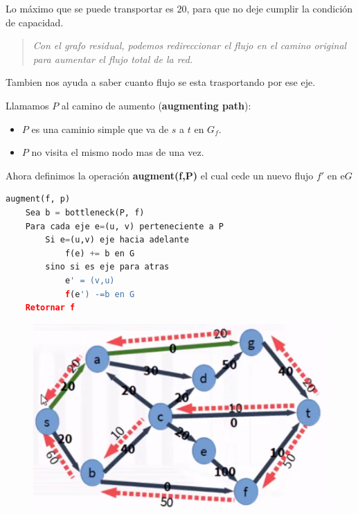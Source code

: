 \documentclass{article}
\begin{document}
Lo máximo que se puede transportar es 20, para que no deje cumplir la condición de capacidad.

\begin{quote}
    \textit{Con el grafo residual, podemos redireccionar el flujo en el camino original para aumentar el flujo total de la red.}
\end{quote}

Tambien nos ayuda a saber cuanto flujo se esta trasportando por ese eje.

Llamamos \(P\) al camino de aumento (\textbf{augmenting path}):

\begin{itemize}
    \item \(P\) es una caminio simple que va de \(s\) a \(t\) en \(G_f\).
    \item \(P\) no visita el mismo nodo mas de una vez.
\end{itemize}
 
Ahora definimos la operación \textbf{augment(f,P)} el cual cede un nuevo flujo \(f'\) en e\(G\)

\begin{lstlisting}[language=Python, caption=Operación de augment]
augment(f, p)
    Sea b = bottleneck(P, f)
    Para cada eje e=(u, v) perteneciente a P
        Si e=(u,v) eje hacia adelante
            f(e) += b en G
        sino si es eje para atras 
            e' = (v,u)
            f(e') -=b en G   
    Retornar f
\end{lstlisting}


\begin{figure}[h!]
    \includegraphics[width=\linewidth]{imagenes/camino-aumento.png}
\end{figure}
\end{document}
